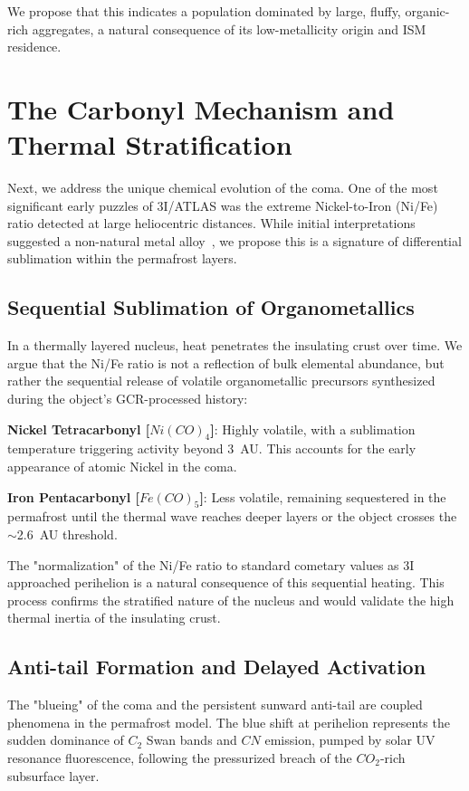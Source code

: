 \documentclass[reprint,aps,prd,noshowpacs]{revtex4-2}
\begin{document}
We propose that this indicates a population dominated by large, fluffy, organic-rich aggregates, a natural consequence of its low-metallicity origin and ISM residence.

\section{The Carbonyl Mechanism and Thermal Stratification}

Next, we address the unique chemical evolution of the coma. One of the most significant early puzzles of 3I/ATLAS was the extreme Nickel-to-Iron (Ni/Fe) ratio detected at large heliocentric distances. While initial interpretations suggested a non-natural metal alloy~\cite{Loeb2025_Nickel3IATLAS}, we propose this is a signature of differential sublimation within the permafrost layers.

\subsection{Sequential Sublimation of Organometallics}

In a thermally layered nucleus, heat penetrates the insulating crust over time. We argue that the Ni/Fe ratio is not a reflection of bulk elemental abundance, but rather the sequential release of volatile organometallic precursors synthesized during the object’s GCR-processed history:

\textbf{Nickel Tetracarbonyl [$Ni(CO)_4$]}: Highly volatile, with a sublimation temperature triggering activity beyond 3~AU. This accounts for the early appearance of atomic Nickel in the coma.

\textbf{Iron Pentacarbonyl [$Fe(CO)_5$]}: Less volatile, remaining sequestered in the permafrost until the thermal wave reaches deeper layers or the object crosses the $\sim$2.6~AU threshold.

The "normalization" of the Ni/Fe ratio to standard cometary values \cite{hutsemekers2025} as 3I approached perihelion is a natural consequence of this sequential heating. This process confirms the stratified nature of the nucleus and would validate the high thermal inertia of the insulating crust.

\subsection{Anti-tail Formation and Delayed Activation}

The "blueing" of the coma \cite{zhang2025} and the persistent sunward anti-tail \cite{scarmato2025} are coupled phenomena in the permafrost model. The blue shift at perihelion represents the sudden dominance of $C_2$ Swan bands and $CN$ emission, pumped by solar UV resonance fluorescence, following the pressurized breach of the $CO_2$-rich subsurface layer.
\end{document}
